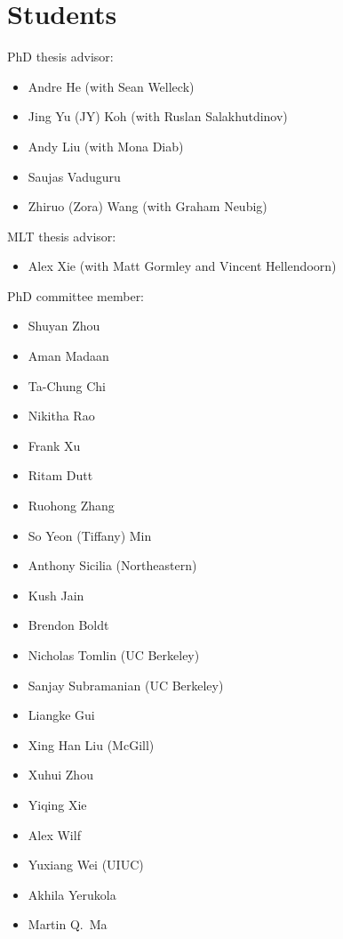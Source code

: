 \section{Students}
PhD thesis advisor:
\begin{itemize}
  \item Andre He (with Sean Welleck)
  \item Jing Yu (JY) Koh (with Ruslan Salakhutdinov)
  \item Andy Liu (with Mona Diab)
  \item Saujas Vaduguru
  \item Zhiruo (Zora) Wang (with Graham Neubig)
\end{itemize}
MLT thesis advisor:
\begin{itemize}
  \item Alex Xie (with Matt Gormley and Vincent Hellendoorn)
\end{itemize}
PhD committee member:
\begin{itemize}
  \item Shuyan Zhou
  \item Aman Madaan
  \item Ta-Chung Chi
  \item Nikitha Rao
  \item Frank Xu
  \item Ritam Dutt
  \item Ruohong Zhang
  \item So Yeon (Tiffany) Min
  \item Anthony Sicilia (Northeastern)
  \item Kush Jain
  \item Brendon Boldt
  \item Nicholas Tomlin (UC Berkeley)
  \item Sanjay Subramanian (UC Berkeley)
  \item Liangke Gui
  \item Xing Han Liu (McGill)
  \item Xuhui Zhou
  \item Yiqing Xie
  \item Alex Wilf
  \item Yuxiang Wei (UIUC)
  \item Akhila Yerukola
  \item Martin Q.\ Ma
\end{itemize}

